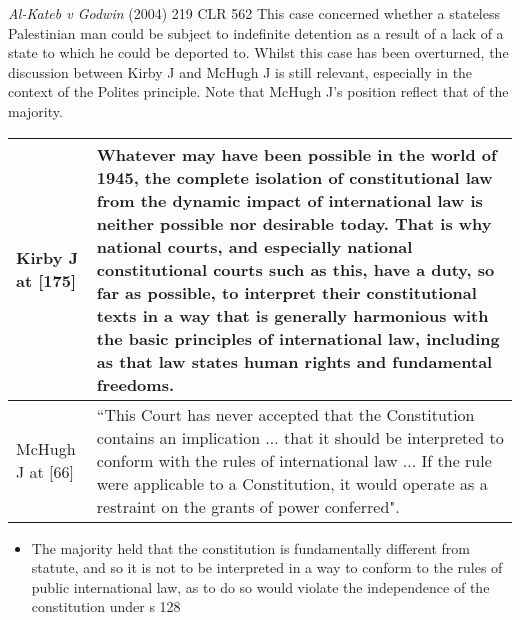 \begin{casedetails}{\textit{Al-Kateb v Godwin} (2004) 219 CLR 562}\label{case:Al-Kateb v Godwin}
    \flushleft
    This case concerned whether a stateless Palestinian man could be subject to indefinite detention as a result of a lack of a state to which he could be deported to. Whilst this case has been overturned, the discussion between Kirby J and McHugh J is still relevant, especially in the context of the Polites principle. Note that McHugh J's position reflect that of the majority.

    \begin{longtable}{p{}|>{\raggedright\arraybackslash}p{}}
        Kirby J at [175] & Whatever may have been possible in the world of 1945, the complete isolation of constitutional law from the dynamic impact of international law is neither possible nor desirable today. That is why national courts, and especially national constitutional courts such as this, have a duty, so far as possible, to interpret their constitutional texts in a way that is generally harmonious with the basic principles of international law, including as that law states human rights and fundamental freedoms. \\[3cm]\hline
        McHugh J at [66] & ``This Court has never accepted that the Constitution contains an implication ... that it should be interpreted to conform with the rules of international law ... If the rule were applicable to a Constitution, it would operate as a restraint on the grants of power conferred".
    \end{longtable}  
\end{casedetails}

\begin{itemize}
    \item The majority held that the constitution is fundamentally different from statute, and so it is not to be interpreted in a way to conform to the rules of public international law, as to do so would violate the independence of the constitution under s 128
\end{itemize}

